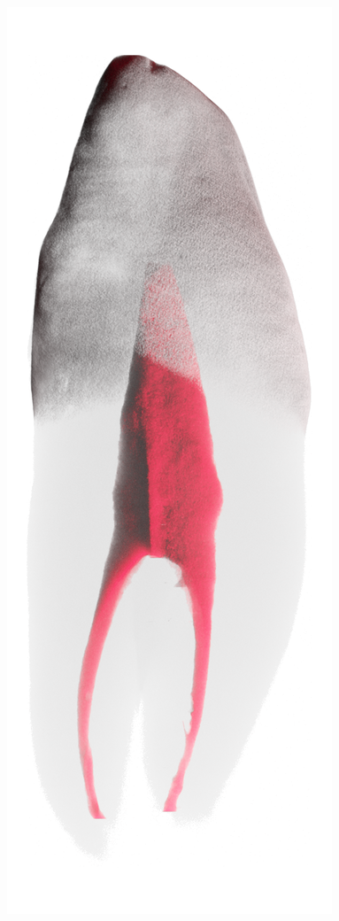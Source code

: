 \begin{frame}
\begin{frame}
		\includegraphics[height=\imheight]{./images/zmk/rcs/Tooth0419}%

\end{frame}
\end{frame}
